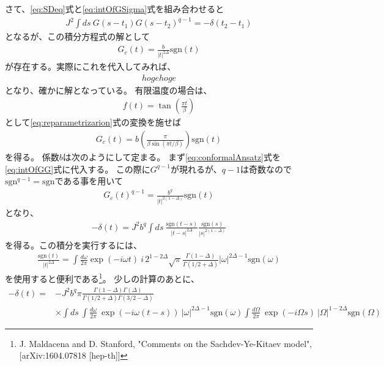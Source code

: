 \documentclass[a4j]{ltjsarticle}
\newcommand{\sgn}{\mathrm{sgn}}
\begin{document}
	さて、\eqref{eq:SDeq}式と\eqref{eq:intOfGSigma}式を組み合わせると
	\begin{align}
	J^2\int ds\ G(s - t_1)G(s - t_2)^{q - 1} = -\delta(t_2 - t_1)
	\label{eq:intOfGG}
	\end{align}
	となるが、この積分方程式の解として
	\begin{align}
	G_c(t) = \frac{b}{|t|^{2\Delta}}\sgn(t)
	\label{eq:conformalAnsatz}
	\end{align}
	が存在する。実際にこれを代入してみれば、
	\begin{align}
	hogehoge
	\end{align}
	となり、確かに解となっている。
	有限温度の場合は、
	\begin{align}
	f(t) = \tan\left(\frac{\pi t}{\beta}\right)
	\end{align}
	として\eqref{eq:reparametrizarion}式の変換を施せば
	\begin{align}
	G_c(t) = b\left(\frac{\pi}{\beta \sin(\pi t / \beta)}\right)\sgn(t)
	\end{align}
	を得る。
	係数$b$は次のようにして定まる。
	まず\eqref{eq:conformalAnsatz}式を\eqref{eq:intOfGG}式に代入する。
	この際に$G^{q-1}$が現れるが、$q-1$は奇数なので$\sgn^{q-1} = \sgn$である事を用いて
	\begin{align}
	G_c(t)^{q-1} = \frac{b^q}{|t|^{2(1 - \Delta)}}\sgn(t)
	\end{align}
	となり、
	\begin{align}
	-\delta(t) = J^2b^q\int ds\ 
		\frac{\sgn(t - s)}{|t - s|^{2\Delta}}
		\frac{\sgn(s)}{|s|^{2(1 - \Delta)}}
	\end{align}
	を得る。この積分を実行するには、
	\begin{align}
	\frac{\sgn(t)}{|t|^{2\Delta}} = 
		\int \frac{d\omega}{2\pi}\exp(-i\omega t)\ 
		i\, 2^{1 - 2\Delta}\sqrt{\pi}\frac{\Gamma(1 - \Delta)}{\Gamma(1/2 + \Delta)}
		|\omega|^{2\Delta - 1}\sgn(\omega)
	\end{align}
	を使用すると便利である\footnote{J. Maldacena and D. Stanford, 
		"Comments on the Sachdev-Ye-Kitaev model", [arXiv:1604.07818 [hep-th]]}。
	少しの計算のあとに、
	\begin{align}
	-\delta(t) = &-J^2b^q\pi
		\frac{\Gamma(1 - \Delta)\Gamma(\Delta)}{\Gamma(1/2 + \Delta)\Gamma(3/2 - \Delta)}
		\nonumber\\
		&\times \int ds\ 
		\int \frac{d\omega}{2\pi}\ \exp(-i\omega(t - s))\ |\omega|^{2\Delta - 1}\sgn(\omega)
		\int \frac{d\Omega}{2\pi}\ \exp(-i\Omega s)\ |\Omega|^{1 - 2\Delta}\sgn(\Omega)
	\end{align}
\end{document}
